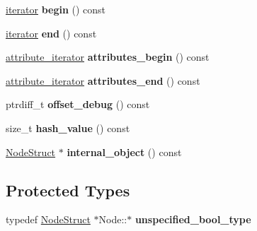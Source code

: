 \begin{DoxyCompactItemize}
\item 
\hypertarget{classphys_1_1xml_1_1Node_a78c82f35dcf7b2c37f1f5ff37d526329}{
\hyperlink{classphys_1_1xml_1_1NodeIterator}{iterator} {\bfseries begin} () const }
\label{d7/d0a/classphys_1_1xml_1_1Node_a78c82f35dcf7b2c37f1f5ff37d526329}

\item 
\hypertarget{classphys_1_1xml_1_1Node_ae69ca8be6e9eb53a4faf8bb50a2996d6}{
\hyperlink{classphys_1_1xml_1_1NodeIterator}{iterator} {\bfseries end} () const }
\label{d7/d0a/classphys_1_1xml_1_1Node_ae69ca8be6e9eb53a4faf8bb50a2996d6}

\item 
\hypertarget{classphys_1_1xml_1_1Node_a601285bed116eb5d63cea9a8d117e5b7}{
\hyperlink{classphys_1_1xml_1_1AttributeIterator}{attribute\_\-iterator} {\bfseries attributes\_\-begin} () const }
\label{d7/d0a/classphys_1_1xml_1_1Node_a601285bed116eb5d63cea9a8d117e5b7}

\item 
\hypertarget{classphys_1_1xml_1_1Node_a9af9e0bff5b8ed06bc40861dccb6b4ec}{
\hyperlink{classphys_1_1xml_1_1AttributeIterator}{attribute\_\-iterator} {\bfseries attributes\_\-end} () const }
\label{d7/d0a/classphys_1_1xml_1_1Node_a9af9e0bff5b8ed06bc40861dccb6b4ec}

\item 
\hypertarget{classphys_1_1xml_1_1Node_a90e927aa23510ab6b7411b3424a3f064}{
ptrdiff\_\-t {\bfseries offset\_\-debug} () const }
\label{d7/d0a/classphys_1_1xml_1_1Node_a90e927aa23510ab6b7411b3424a3f064}

\item 
\hypertarget{classphys_1_1xml_1_1Node_ad759e1e8c2c131e7ed438ce6308fd79b}{
size\_\-t {\bfseries hash\_\-value} () const }
\label{d7/d0a/classphys_1_1xml_1_1Node_ad759e1e8c2c131e7ed438ce6308fd79b}

\item 
\hypertarget{classphys_1_1xml_1_1Node_a911d3691004d14cb60dcefbe85c41046}{
\hyperlink{structphys_1_1xml_1_1NodeStruct}{NodeStruct} $\ast$ {\bfseries internal\_\-object} () const }
\label{d7/d0a/classphys_1_1xml_1_1Node_a911d3691004d14cb60dcefbe85c41046}

\end{DoxyCompactItemize}
\subsection*{Protected Types}
\begin{DoxyCompactItemize}
\item 
\hypertarget{classphys_1_1xml_1_1Node_abace2c2c7e70431d920579917417c1e4}{
typedef \hyperlink{structphys_1_1xml_1_1NodeStruct}{NodeStruct} $\ast$Node::$\ast$ {\bfseries unspecified\_\-bool\_\-type}}
\label{d7/d0a/classphys_1_1xml_1_1Node_abace2c2c7e70431d920579917417c1e4}

\end{DoxyCompactItemize}
